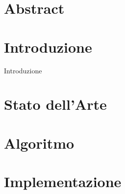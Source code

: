 \documentclass[12pt,oneside]{report}
\begin{document}
 
	                
	\begin{titlepage}
		
	\end{titlepage} 
    
    
	\chapter*{Abstract}
	
    \tableofcontents{}
    \listoftables
    \listoflistings
    \newpage
    \chapter{Introduzione}
    {Introduzione}
    \chapter{Stato dell'Arte}
    \chapter{Algoritmo}
    \chapter{Implementazione}
 
     
    
\end{document}
